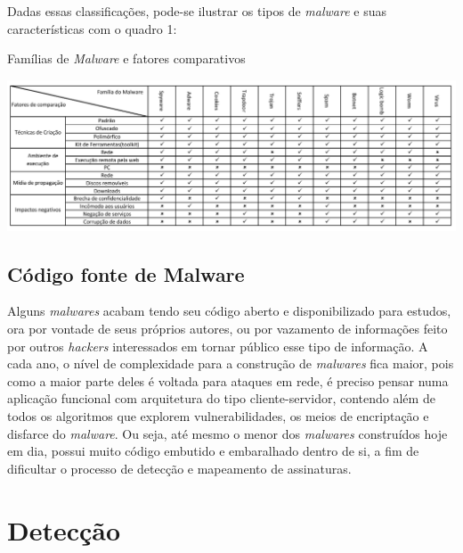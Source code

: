 Dadas essas classificações, pode-se ilustrar os tipos de \textit{malware} e suas características com o quadro 1:
\renewcommand{\thequadro}{\arabic{quadro}}

\begin{quadro}[H]
\caption{\small Famílias de \textit{Malware} e fatores comparativos}
\centering
\includegraphics{figs/tabela.pdf}
\label{f.tabelamalware}
\end{quadro}

\subsection{Código fonte de Malware} %
\label{ssub:exemplos_malware}

Alguns \textit{malwares} acabam tendo seu código aberto e disponibilizado para
estudos, ora por vontade de seus próprios autores, ou por vazamento de
informações feito por outros \textit{hackers} interessados em tornar público
esse tipo de informação. A cada ano, o nível de complexidade para a construção
de \textit{malwares} fica maior, pois como a maior parte deles é voltada para
ataques em rede, é preciso pensar numa aplicação funcional com arquitetura do
tipo cliente-servidor, contendo além de todos os algoritmos que explorem
vulnerabilidades, os meios de encriptação e disfarce do \textit{malware}. Ou
seja, até mesmo o menor dos \textit{malwares} construídos hoje em dia, possui
muito código embutido e embaralhado dentro de si, a fim de dificultar o processo
de detecção e mapeamento de assinaturas.

\section{Detecção}
\label{s.deteccao}

